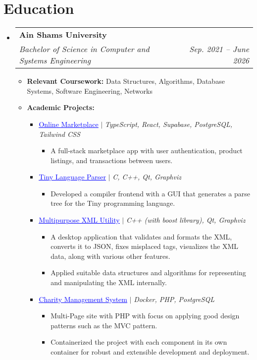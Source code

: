 \documentclass[letterpaper,11pt]{article}
\makeatletter
\newcommand{\resumeItem}[1]{
  \item\small{
    {#1 \vspace{-2pt}}
  }
}
\newcommand{\resumeSubheading}[4]{
  \vspace{-2pt}\item
    \begin{tabular*}{0.97\textwidth}[t]{l@{\extracolsep{\fill}}r}
      \textbf{#1} & #2 \\
      \textit{\small#3} & \textit{\small #4} \\
    \end{tabular*}\vspace{-7pt}
}
\newcommand{\resumeSubHeadingListStart}{\begin{itemize}[leftmargin=0.15in, label={}]}
\newcommand{\resumeSubHeadingListEnd}{\end{itemize}}
\newcommand{\resumeItemListStart}{\begin{itemize}}
\newcommand{\resumeItemListEnd}{\end{itemize}\vspace{-5pt}}
\makeatother
\begin{document}
\section{Education}
  \resumeSubHeadingListStart
    \resumeSubheading
      {Ain Shams University}{}
      {Bachelor of Science in Computer and Systems Engineering}{Sep. 2021 -- June 2026}
      \resumeItemListStart
        \resumeItem{\textbf{Relevant Coursework:} Data Structures, Algorithms, Database Systems, Software Engineering, Networks}
        \resumeItem{\textbf{Academic Projects:}}
        \begin{itemize}
          \item \small{\href{https://github.com/KhalidAlansary/Jelato}{\textcolor{blue}{\underline{Online Marketplace}}}} $|$ \emph{TypeScript, React, Supabase, PostgreSQL, Tailwind CSS}
          \begin{itemize}
            \item A full-stack marketplace app with user authentication, product listings, and transactions between users.
          \end{itemize}
          \item \small{\href{https://github.com/KhalidAlansary/tiny-parser}{\textcolor{blue}{\underline{Tiny Language Parser}}}} $|$ \emph{C, C++, Qt, Graphviz}
          \begin{itemize}
            \item Developed a compiler frontend with a GUI that generates a parse tree for the Tiny programming language.
          \end{itemize}
          \item \small{\href{https://github.com/KhalidAlansary/ugly-duckling}{\textcolor{blue}{\underline{Multipurpose XML Utility}}}} $|$ \emph{C++ (with boost library), Qt, Graphviz}
          \begin{itemize}
            \item A desktop application that validates and formats the XML, converts it to JSON, fixes misplaced tags, visualizes the XML data, along with various other features.
            \item Applied suitable data structures and algorithms for representing and manipulating the XML internally.
          \end{itemize}
          \item \small{\href{https://github.com/KhalidAlansary/Charity}{\textcolor{blue}{\underline{Charity Management System}}}} $|$ \emph{Docker, PHP, PostgreSQL}
          \begin{itemize}
            \item Multi-Page site with PHP with focus on applying good design patterns such as the MVC pattern.
            \item Containerized the project with each component in its own container for robust and extensible development and deployment.
          \end{itemize}
        \end{itemize}
      \resumeItemListEnd
  \resumeSubHeadingListEnd
\end{document}
